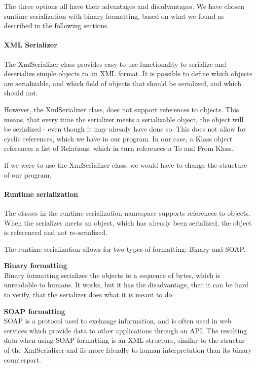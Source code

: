 The three options all have their advantages and disadvantages. We have chosen
runtime serialization with binary formatting, based on what we found as
described in the following sections.

\paragraph{XML Serializer}

The XmlSerializer class provides easy to use
functionality to serialize and deserialize simple objects to an XML format. It
is possible to define which objects are serializable, and which field of objects
that should be serialized, and which should not.

However, the XmlSerializer class, does not support references to objects. This
means, that every time the serializer meets a serializable object, the object
will be serialized - even though it may already have done so. This does not
allow for cyclic references, which we have in our program. In our case, a Klass
object references a list of Relations, which in turn references a To and From
Klass.

If we were to use the XmlSerializer class, we would have to change the structure
of our program.

\paragraph{Runtime serialization}

The classes in the runtime serialization
namespace supports references to objects. When the serializer meets an object,
which has already been serialized, the object is referenced and not
re-serialized.


The runtime serialization allows for two types of formatting: Binary and SOAP.

\textbf{Binary formatting}\\
Binary formatting serializes the objects to a
sequence of bytes, which is unreadable to humans. It works, but it has the
disadvantage, that it can be hard to verify, that the serializer does what it is
meant to do.

\textbf{SOAP formatting}\\
SOAP is a protocol used to exchange information, and
is often used in web services which provide data to other applications through
an API. The resulting data when using SOAP formatting is an XML structure,
similar to the structur of the XmlSerializer and iis more friendly to human
interpretation than its binary counterpart.

